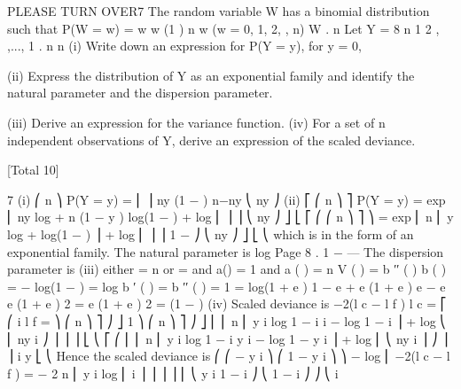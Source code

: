 \documentclass[a4paper,12pt]{article}
\begin{document}
 


PLEASE TURN OVER7
The random variable W has a binomial distribution such that
P(W = w) =
w
w
(1
) n
w
(w = 0, 1, 2,
, n)
W
.
n
Let Y =
8
n
1 2
, ,..., 1 .
n n
(i) Write down an expression for P(Y = y), for y = 0,

(ii) Express the distribution of Y as an exponential family and identify the natural
parameter and the dispersion parameter.

(iii) Derive an expression for the variance function.
(iv) For a set of n independent observations of Y, derive an expression of the
scaled deviance.

[Total 10]
\newpage


7
(i) ⎛ n ⎞
P(Y = y) = ⎜ ⎟ \mu ny (1 − \mu) n−ny
⎝ ny ⎠
(ii) ⎡
⎛ n ⎞ ⎤
P(Y = y) = exp ⎢ ny log \mu + n (1 − y ) log(1 − \mu ) + log ⎜ ⎟ ⎥
⎝ ny ⎠ ⎦
⎣
⎡ ⎛
⎛ n ⎞ ⎤
⎞
\mu
= exp ⎢ n ⎜ y log
+ log(1 − \mu ) ⎟ + log ⎜ ⎟ ⎥
1 − \mu
⎠
⎝ ny ⎠ ⎦
⎣ ⎝
which is in the form of an exponential family.
The natural parameter is log
Page 8
\mu
.
1 − \mu — %
The dispersion parameter is
(iii)
either \phi  = n
or \phi  =
and a(\phi ) =
1
and a ( \phi  ) = \phi 
n
V ( \mu ) = b ′′ ( \theta  )
b ( \theta  ) = − log(1 − \mu ) = log
b ′ ( \theta  ) =
b ′′ ( \theta  ) =
1
= log(1 + e \theta  )
1 − \mu
e  + e \theta 
(1 + e \theta  ) e \theta  − e \theta  e \theta 
(1 + e \theta  ) 2
=
e \theta 
(1 + e \theta  ) 2
= \mu(1 − \mu)
(iv)
Scaled deviance is −2(l c − l f )
l c =
⎡ ⎛
i
l f =
 ⎞ ⎛ n ⎞ ⎤
⎠ ⎦
1 ⎞ ⎛ n ⎞ ⎤
⎠ ⎦
\sum  ⎢ ⎢ n ⎜ y i log 1 − \mu i i − log 1 − \mu i ⎟ + log ⎝ ⎜ ny i ⎠ ⎟ ⎥ ⎥
⎣ ⎝
⎡ ⎛
\sum  ⎢ ⎢ n ⎜ y i log 1 − i y i − log 1 − y i ⎟ + log ⎜ ⎝ ny i ⎟ ⎠ ⎥ ⎥
i
y
⎣ ⎝
Hence the scaled deviance is
⎛
⎛  − y i ⎞
⎛ 1 − y i ⎞ ⎞
− log ⎜
−2(l c − l f ) = − 2 \sum  n ⎜ y i log ⎜ i
⎟
⎟ ⎟ ⎟
⎜
⎝ y i 1 − \mu i ⎠
⎝ 1 − \mu i ⎠ ⎠
⎝
i
\end{document}
